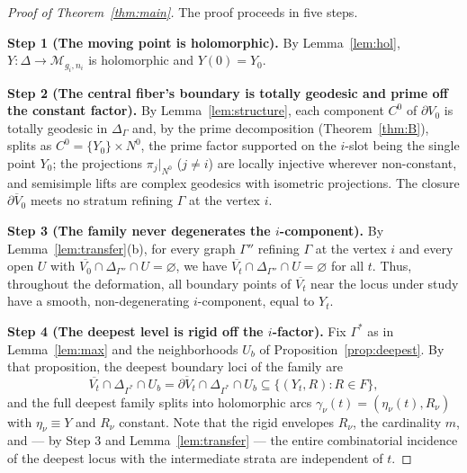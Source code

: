 \documentclass[11pt]{amsart}
\theoremstyle{definition}
\theoremstyle{remark}
\newcommand{\M}{\mathcal{M}}
\begin{document}
\begin{proof}[Proof of Theorem~\ref{thm:main}]
The proof proceeds in five steps.

\medskip
\noindent\textbf{Step 1 (The moving point is holomorphic).}
By Lemma~\ref{lem:hol}, $Y:\Delta\to\M_{g_i,n_i}$ is holomorphic and
$Y(0)=Y_0$.

\medskip
\noindent\textbf{Step 2 (The central fiber's boundary is totally geodesic
and prime off the constant factor).}
By Lemma~\ref{lem:structure}, each component $C^0$ of $\partial V_0$ is
totally geodesic in $\Delta_\Gamma$ and, by the prime decomposition
(Theorem~\ref{thm:B}), splits as $C^0=\{Y_0\}\times N^0$, the prime factor
supported on the $i$-slot being the single point $Y_0$; the projections
$\pi_j|_{N^0}$ ($j\neq i$) are locally injective wherever non-constant, and
semisimple lifts are complex geodesics with isometric projections. The
closure $\overline{\partial V_0}$ meets no stratum refining $\Gamma$ at the
vertex $i$.

\medskip
\noindent\textbf{Step 3 (The family never degenerates the $i$-component).}
By Lemma~\ref{lem:transfer}(b), for every graph $\Gamma''$ refining
$\Gamma$ at the vertex $i$ and every open $U$ with
$\overline{V_0}\cap\Delta_{\Gamma''}\cap U=\varnothing$, we have
$\overline{V_t}\cap\Delta_{\Gamma''}\cap U=\varnothing$ for all $t$. Thus,
throughout the deformation, all boundary points of $\overline{V_t}$ near the
locus under study have a smooth, non-degenerating $i$-component, equal to
$Y_t$.

\medskip
\noindent\textbf{Step 4 (The deepest level is rigid off the $i$-factor).}
Fix $\Gamma^*$ as in Lemma~\ref{lem:max} and the neighborhoods $U_b$ of
Proposition~\ref{prop:deepest}. By that proposition, the deepest boundary
loci of the family are
\[
\overline{V_t}\cap\Delta_{\Gamma^*}\cap U_b
=\overline{\partial V_t}\cap\Delta_{\Gamma^*}\cap U_b
\subseteq\{(Y_t,R)\colon R\in F\},
\]
and the full deepest family splits into holomorphic arcs
$\gamma_\nu(t)=(\eta_\nu(t),R_\nu)$ with $\eta_\nu\equiv Y$ and $R_\nu$
constant. Note that the rigid envelopes $R_\nu$, the cardinality $m$, and
--- by Step 3 and Lemma~\ref{lem:transfer} --- the entire combinatorial
incidence of the deepest locus with the intermediate strata are independent
of $t$.


\end{proof}
\end{document}
